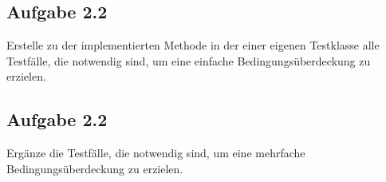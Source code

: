 \subsection*{Aufgabe 2.2}

Erstelle zu der implementierten Methode in der einer eigenen Testklasse alle Testfälle, die notwendig sind, um eine einfache Bedingungsüberdeckung zu erzielen.

\subsection*{Aufgabe 2.2}

Ergänze die Testfälle, die notwendig sind, um eine mehrfache Bedingungsüberdeckung zu erzielen.

